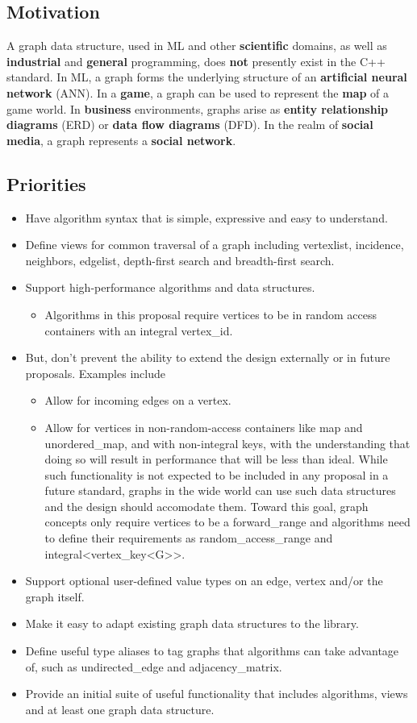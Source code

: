 \documentclass[10pt,onecolumn]{article}
\begin{document}
\subsection{Motivation}
A graph data structure, used in ML and other \textbf{scientific} domains, as well as \textbf{industrial} and \textbf{general} programming, does \textbf{not} presently exist in the C++ standard. In ML, a graph forms the underlying structure of an \textbf{artificial neural network} (ANN). In a \textbf{game}, a graph can be used to
represent the \textbf{map} of a game world. In \textbf{business} environments, graphs arise as \textbf{entity relationship diagrams} (ERD) or \textbf{data flow diagrams} (DFD). In the realm of \textbf{social media}, a graph represents a \textbf{social network}.

\subsection{Priorities}
\begin{itemize}
\item Have algorithm syntax that is simple, expressive and easy to understand.
\item Define views for common traversal of a graph including vertexlist, incidence, neighbors, edgelist, depth-first search and breadth-first search.
\item Support high-performance algorithms and data structures.
\begin{itemize}
\item Algorithms in this proposal require vertices to be in random access containers with an integral vertex\_id.
\end{itemize}
\item But, don't prevent the ability to extend the design externally or in future proposals. Examples include
\begin{itemize}
\item Allow for incoming edges on a vertex.
\item Allow for vertices in non-random-access containers like map and unordered\_map, and with non-integral keys, with the understanding that 
doing so will result in performance that will be less than ideal. While such functionality is not expected to be included in any proposal in a future 
standard, graphs in the wide world can use such data structures and the design should accomodate them. Toward this goal, graph concepts only
require vertices to be a forward\_range and algorithms need to define their requirements as random\_access\_range and integral<vertex\_key<G>>.
\end{itemize}
\item Support optional user-defined value types on an edge, vertex and/or the graph itself.
\item Make it easy to adapt existing graph data structures to the library.
\item Define useful type aliases to tag graphs that algorithms can take advantage of, such as undirected\_edge and adjacency\_matrix.
\item Provide an initial suite of useful functionality that includes algorithms, views and at least one graph data structure.
\end{itemize}
\end{document}
